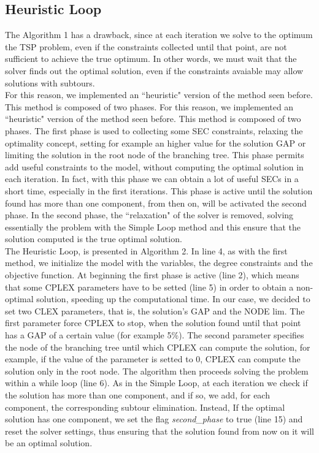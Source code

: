 \subsection{Heuristic Loop}
The Algorithm 1 has a drawback, since at each iteration we solve to the optimum the TSP problem, even if the constraints collected until that point, are not sufficient to achieve the true optimum. In other words, we must wait that the solver finds out the optimal solution, even if the constraints avaiable may allow solutions with subtours.
\\ For this reason, we implemented an ``heuristic" version of the method seen before. This method is composed of two phases. 
For this reason, we implemented an ``heuristic" version of the method seen before. This method is composed of two phases. The first phase is used to collecting some SEC constraints, relaxing the optimality concept, setting for example an higher value for the solution GAP or limiting the solution in the root node of the branching tree.
This phase permits add useful constraints to the model, without computing the optimal solution in each iteration. In fact, with this phase we can obtain a lot of useful SECs in a short time, especially in the first iterations.
This phase is active until the solution found has more than one component, from then on, will be activated the second phase. 
In the second phase, the ``relaxation" of the solver is removed, solving essentially the problem with the Simple Loop method and this ensure that the solution computed is the true optimal solution.
\\ The Heuristic Loop, is presented in Algorithm 2. In line 4, as with the first method, we initialize the model with the variables, the degree constraints and the objective function.
At beginning the first phase is active (line 2), which means that some CPLEX parameters have to be setted (line 5) in order to obtain a non-optimal solution, speeding up the computational time. In our case, we decided to set two CLEX parameters, that is, the solution's GAP and the NODE lim. The first parameter force CPLEX to stop, when the solution found until that point has a GAP of a certain value (for example 5\%). The second parameter specifies the node of the branching tree until which CPLEX can compute the solution, for example, if the value of the parameter is setted to 0, CPLEX can compute the solution only in the root node.
The algorithm then proceeds solving the problem within a while loop (line 6). As in the Simple Loop, at each iteration we check if the solution has more than one component, and if so, we add, for each component, the corresponding subtour elimination. Instead, If the optimal solution has one component, we set the flag \textit{second\_phase} to true (line 15) and reset the solver settings, thus ensuring that the solution found from now on it will be an optimal solution.
